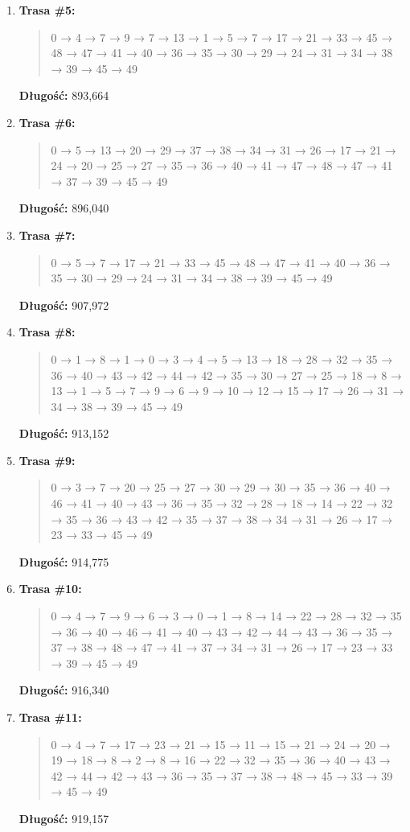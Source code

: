 \documentclass{article}
\begin{document}
\begin{enumerate}
    \item \textbf{Trasa \#5:}
    \begin{quote}
        0 → 4 → 7 → 9 → 7 → 13 → 1 → 5 → 7 → 17 → 21 → 33 → 45 → 48 → 47 → 41 → 40 → 36 → 35 → 30 → 29 → 24 → 31 → 34 → 38 → 39 → 45 → 49
    \end{quote}
    \textbf{Długość:} 893{,}664

    \item \textbf{Trasa \#6:}
    \begin{quote}
        0 → 5 → 13 → 20 → 29 → 37 → 38 → 34 → 31 → 26 → 17 → 21 → 24 → 20 → 25 → 27 → 35 → 36 → 40 → 41 → 47 → 48 → 47 → 41 → 37 → 39 → 45 → 49
    \end{quote}
    \textbf{Długość:} 896{,}040

    \item \textbf{Trasa \#7:}
    \begin{quote}
        0 → 5 → 7 → 17 → 21 → 33 → 45 → 48 → 47 → 41 → 40 → 36 → 35 → 30 → 29 → 24 → 31 → 34 → 38 → 39 → 45 → 49
    \end{quote}
    \textbf{Długość:} 907{,}972

    \item \textbf{Trasa \#8:}
    \begin{quote}
        0 → 1 → 8 → 1 → 0 → 3 → 4 → 5 → 13 → 18 → 28 → 32 → 35 → 36 → 40 → 43 → 42 → 44 → 42 → 35 → 30 → 27 → 25 → 18 → 8 → 13 → 1 → 5 → 7 → 9 → 6 → 9 → 10 → 12 → 15 → 17 → 26 → 31 → 34 → 38 → 39 → 45 → 49
    \end{quote}
    \textbf{Długość:} 913{,}152

    \item \textbf{Trasa \#9:}
    \begin{quote}
        0 → 3 → 7 → 20 → 25 → 27 → 30 → 29 → 30 → 35 → 36 → 40 → 46 → 41 → 40 → 43 → 36 → 35 → 32 → 28 → 18 → 14 → 22 → 32 → 35 → 36 → 43 → 42 → 35 → 37 → 38 → 34 → 31 → 26 → 17 → 23 → 33 → 45 → 49
    \end{quote}
    \textbf{Długość:} 914{,}775

    \item \textbf{Trasa \#10:}
    \begin{quote}
        0 → 4 → 7 → 9 → 6 → 3 → 0 → 1 → 8 → 14 → 22 → 28 → 32 → 35 → 36 → 40 → 46 → 41 → 40 → 43 → 42 → 44 → 43 → 36 → 35 → 37 → 38 → 48 → 47 → 41 → 37 → 34 → 31 → 26 → 17 → 23 → 33 → 39 → 45 → 49
    \end{quote}
    \textbf{Długość:} 916{,}340

    \item \textbf{Trasa \#11:}
    \begin{quote}
        0 → 4 → 7 → 17 → 23 → 21 → 15 → 11 → 15 → 21 → 24 → 20 → 19 → 18 → 8 → 2 → 8 → 16 → 22 → 32 → 35 → 36 → 40 → 43 → 42 → 44 → 42 → 43 → 36 → 35 → 37 → 38 → 48 → 45 → 33 → 39 → 45 → 49
    \end{quote}
    \textbf{Długość:} 919{,}157


\end{enumerate}
\end{document}

